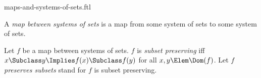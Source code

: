 \documentclass{stex}
\begin{document}
\begin{smodule}{maps-and-systems-of-sets.ftl}



\begin{definition*}[forthel,for=map between systems of sets]
  A \emph{map between systems of sets} is a map from some system of sets to some system of sets.
\end{definition*}

\begin{definition*}[forthel,for={subset preserving,preserve subsets}]
  Let $f$ be a map between systems of sets.
  $f$ is \emph{subset preserving} iff $x \Subclass y \Implies f(x) \Subclass f(y)$ for all $x, y \Elem \Dom(f)$.
  Let $f$ \emph{preserves subsets} stand for $f$ is subset preserving.
\end{definition*}

\end{smodule}
\end{document}
